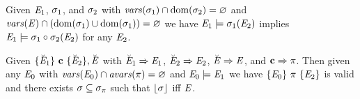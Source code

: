 \begin{lemma}
  \label{lemma-hardpacksubn}
  Given $\mathit{E}_1$, $\sigma_1$, and $\sigma_2$ with $\mathit{vars}(\sigma_1) \cap \mathrm{dom}(\sigma_2)= \varnothing$
  and $\mathit{vars}(\mathit{E}) \cap (\mathrm{dom}(\sigma_1) \cup \mathrm{dom}(\sigma_1)) = \varnothing$ we have
  $\mathit{E}_1 \models \sigma_1(\mathit{E}_2)$ implies $\mathit{E}_1 \models \sigma_1 \circ \sigma_2(\mathit{E}_2)$ for
  any $\mathit{E}_2$.
\end{lemma}

\begin{lemma}
  \label{lemma-htrip}
  Given $\{ \breve{\mathit{E}}_1 \}\ \mathbf{c}\ \{ \breve{\mathit{E}}_2 \},\breve{\mathit{E}}$ with $\breve{\mathit{E}}_1 \Rightarrow
  \mathit{E}_1$, $\breve{\mathit{E}}_2 \Rightarrow \mathit{E}_2$, $\breve{\mathit{E}} \Rightarrow \mathit{E}$, and $\mathbf{c} \Rightarrow
  \pi$. Then given any $\mathit{E}_0$ with $\mathit{vars}(\mathit{E}_0) \cap
  \mathit{avars}(\pi) = \varnothing$ and $\mathit{E}_0 \models \mathit{E}_1$ we have
  $\{ \mathit{E}_0 \}\ \pi\ \{ \mathit{E}_2 \}$ is valid and there exists $\sigma
  \subseteq \sigma_\pi$ such that $\lfloor \sigma \rfloor$ iff $\mathit{E}$.
\end{lemma}

